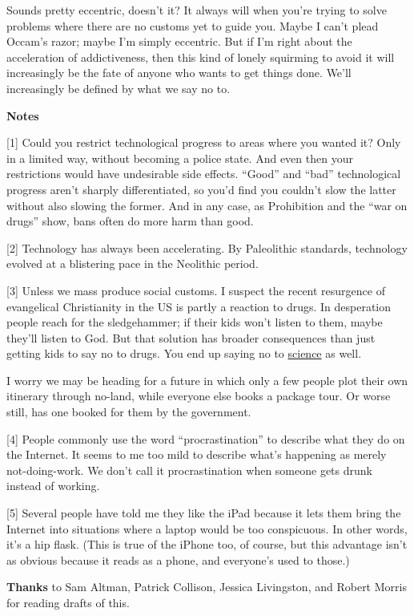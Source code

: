 Sounds pretty eccentric, doesn't it? It always will when you're trying
to solve problems where there are no customs yet to guide you. Maybe I
can't plead Occam's razor; maybe I'm simply eccentric. But if I'm right
about the acceleration of addictiveness, then this kind of lonely
squirming to avoid it will increasingly be the fate of anyone who wants
to get things done. We'll increasingly be defined by what we say no to.

\textbf{Notes}

{[}1{]} Could you restrict technological progress to areas where you
wanted it? Only in a limited way, without becoming a police state. And
even then your restrictions would have undesirable side effects.
``Good'' and ``bad'' technological progress aren't sharply
differentiated, so you'd find you couldn't slow the latter without also
slowing the former. And in any case, as Prohibition and the ``war on
drugs'' show, bans often do more harm than good.

{[}2{]} Technology has always been accelerating. By Paleolithic
standards, technology evolved at a blistering pace in the Neolithic
period.

{[}3{]} Unless we mass produce social customs. I suspect the recent
resurgence of evangelical Christianity in the US is partly a reaction to
drugs. In desperation people reach for the sledgehammer; if their kids
won't listen to them, maybe they'll listen to God. But that solution has
broader consequences than just getting kids to say no to drugs. You end
up saying no to
\href{https://www.youtube.com/watch?v=GbXgsMxOPtI}{science} as well.

I worry we may be heading for a future in which only a few people plot
their own itinerary through no-land, while everyone else books a package
tour. Or worse still, has one booked for them by the government.

{[}4{]} People commonly use the word ``procrastination'' to describe
what they do on the Internet. It seems to me too mild to describe what's
happening as merely not-doing-work. We don't call it procrastination
when someone gets drunk instead of working.

{[}5{]} Several people have told me they like the iPad because it lets
them bring the Internet into situations where a laptop would be too
conspicuous. In other words, it's a hip flask. (This is true of the
iPhone too, of course, but this advantage isn't as obvious because it
reads as a phone, and everyone's used to those.)

\textbf{Thanks} to Sam Altman, Patrick Collison, Jessica Livingston, and
Robert Morris for reading drafts of this.
